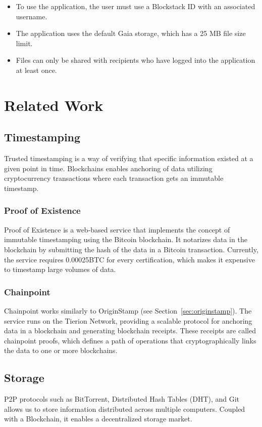 \begin{itemize}
	\item To use the application, the user must use a Blockstack ID with an associated username.
	\item The application uses the default Gaia storage, which has a 25 MB file size limit.
	\item Files can only be shared with recipients who have logged into the application at least once.
\end{itemize}

\section{Related Work}
\subsection{Timestamping}
Trusted timestamping is a way of verifying that specific information existed at a given point in time. Blockchains enables anchoring of data utilizing cryptocurrency transactions where each transaction gets an immutable timestamp.

\subsubsection{Proof of Existence}
Proof of Existence\cite{web:poex:1} is a web-based service that implements the concept of immutable timestamping using the Bitcoin blockchain. It notarizes data in the blockchain by submitting the hash of the data in a Bitcoin transaction. Currently, the service requires 0.00025BTC for every certification, which makes it expensive to timestamp large volumes of data.

\subsubsection{Chainpoint}
Chainpoint\cite{web:chainpoint:1} works similarly to OriginStamp (see Section~\ref{sec:originstamp}). The service runs on the Tierion\cite{web:tierion:1} Network, providing a scalable protocol for anchoring data in a blockchain and generating blockchain receipts. These receipts are called chainpoint proofs, which defines a path of operations that cryptographically links the data to one or more blockchains.

\subsection{Storage}
P2P protocols such as BitTorrent\cite{cohen2008bittorrent}, Distributed Hash Tables (DHT), and Git allows us to store information distributed across multiple computers. Coupled with a Blockchain, it enables a decentralized storage market.

